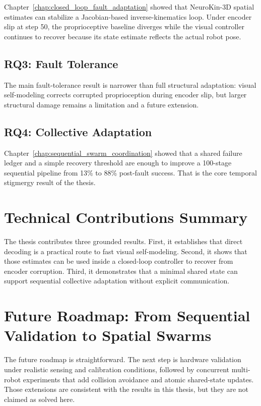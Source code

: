 \documentclass[12pt,a4paper,oneside]{report}
\begin{document}
Chapter~\ref{chap:closed_loop_fault_adaptation} showed that NeuroKin-3D spatial estimates can stabilize a Jacobian-based inverse-kinematics loop. Under encoder slip at step 50, the proprioceptive baseline diverges while the visual controller continues to recover because its state estimate reflects the actual robot pose.

\subsection{RQ3: Fault Tolerance}
\label{subsec:rq3_fault_tolerance_1}

The main fault-tolerance result is narrower than full structural adaptation: visual self-modeling corrects corrupted proprioception during encoder slip, but larger structural damage remains a limitation and a future extension.

\subsection{RQ4: Collective Adaptation}
\label{subsec:rq4_collective_adaptation_1}

Chapter~\ref{chap:sequential_swarm_coordination} showed that a shared failure ledger and a simple recovery threshold are enough to improve a 100-stage sequential pipeline from 13\% to 88\% post-fault success. That is the core temporal stigmergy result of the thesis.

\section{Technical Contributions Summary}

The thesis contributes three grounded results. First, it establishes that direct decoding is a practical route to fast visual self-modeling. Second, it shows that those estimates can be used inside a closed-loop controller to recover from encoder corruption. Third, it demonstrates that a minimal shared state can support sequential collective adaptation without explicit communication.

\section{Future Roadmap: From Sequential Validation to Spatial Swarms}

The future roadmap is straightforward. The next step is hardware validation under realistic sensing and calibration conditions, followed by concurrent multi-robot experiments that add collision avoidance and atomic shared-state updates. Those extensions are consistent with the results in this thesis, but they are not claimed as solved here.
\end{document}
